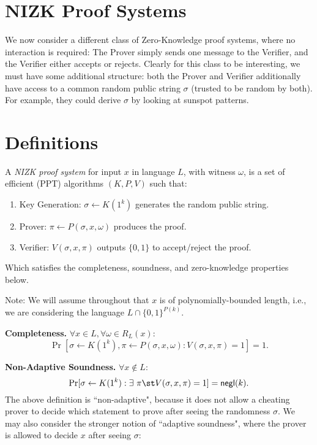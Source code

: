 
\newcommand{\rgets}{\overset{\$}{\gets}}
\section{NIZK Proof Systems}
We now consider a different class of Zero-Knowledge proof systems, where no
interaction is required: The Prover simply sends one message to the Verifier,
and the Verifier either accepts or rejects. Clearly for this class to be
interesting, we must have some additional structure:
both the Prover and Verifier additionally have access to a common random public string
$\sigma$ (trusted to be random by both). For example, they could derive $\sigma$
by looking at sunspot patterns. 

\section{Definitions}

\begin{definition}
    A \emph{NIZK proof system} for input $x$ in language $L$, with witness $\omega$, is a set of
efficient (PPT) algorithms $(K, P, V)$ such that:
\begin{enumerate}
    \item Key Generation: $\sigma \gets K(1^k)$ generates the random public string.
    \item Prover: $\pi \gets P(\sigma, x, \omega)$ produces the proof.
    \item Verifier: $V(\sigma, x, \pi)$ outputs $\{0, 1\}$ to accept/reject the proof.
\end{enumerate}
Which satisfies the completeness, soundness, and zero-knowledge properties below.
\end{definition}
Note: We will assume throughout that $x$ is of polynomially-bounded length, i.e., we are
considering the language $L \cap \{0, 1\}^{P(k)}$.


\medskip
\noindent\textbf{Completeness.} $\forall x \in L, \forall \omega \in R_L(x)$:
    $$\Pr[\sigma \gets K(1^k), \pi \gets P(\sigma, x, \omega) : V(\sigma, x,
    \pi) = 1] = 1.$$

\medskip
\noindent\textbf{Non-Adaptive Soundness.} $\forall x \not\in L$:
    $$\Pr[\sigma \gets K(1^k): \exists~\pi \st V(\sigma, x, \pi)
    = 1] = \mathsf{negl}(k).$$
The above definition is ``non-adaptive", because it does not allow a cheating
prover to decide which statement to prove after seeing the randomness $\sigma$.
We may also consider the stronger notion of ``adaptive soundness", where the
prover is allowed to decide $x$ after seeing $\sigma$:

